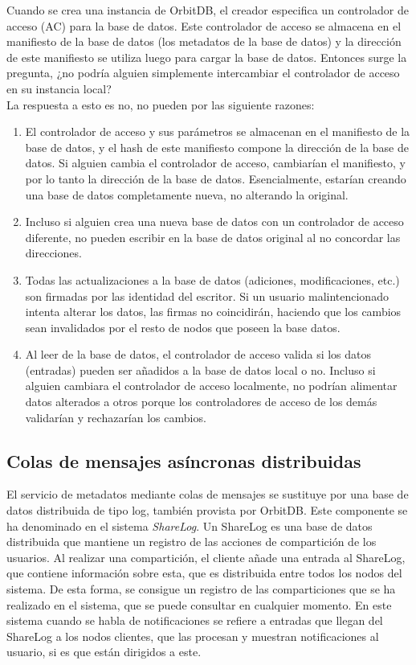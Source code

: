 Cuando se crea una instancia de OrbitDB, el creador especifica un controlador de acceso (AC) para la base de datos.
Este controlador de acceso se almacena en el manifiesto de la base de datos (los metadatos de la base de datos)
y la dirección de este manifiesto se utiliza luego para cargar la base de datos. Entonces surge la pregunta, ¿no podría alguien simplemente intercambiar el controlador de acceso en su instancia local?
\\
La respuesta a esto es no, no pueden por las siguiente razones:
\begin{enumerate}[noitemsep,after=\vspace{-0.4\baselineskip}]
  \item El controlador de acceso y sus parámetros se almacenan en el manifiesto de la base de datos, y el hash de este manifiesto compone la dirección de la base de datos. Si alguien cambia el controlador de acceso, cambiarían el manifiesto, y por lo tanto la dirección de la base de datos. Esencialmente, estarían creando una base de datos completamente nueva, no alterando la original.
  \item Incluso si alguien crea una nueva base de datos con un controlador de acceso diferente, no pueden escribir en la base de datos original al no concordar las direcciones.
  \item Todas las actualizaciones a la base de datos (adiciones, modificaciones, etc.) son firmadas por las identidad del escritor. Si un usuario malintencionado intenta alterar los datos, las firmas no coincidirán, haciendo que los cambios sean invalidados por el resto de nodos que poseen la base datos.
  \item Al leer de la base de datos, el controlador de acceso valida si los datos (entradas) pueden ser añadidos a la base de datos local o no. Incluso si alguien cambiara el controlador de acceso localmente, no podrían alimentar datos alterados a otros porque los controladores de acceso de los demás validarían y rechazarían los cambios.
\end{enumerate}

\subsection{Colas de mensajes asíncronas distribuidas}
El servicio de metadatos mediante colas de mensajes se sustituye por una base de datos distribuida de tipo
log, también provista por OrbitDB. Este componente se ha denominado en el sistema \textit{ShareLog}.
Un ShareLog es una base de datos distribuida que mantiene un registro de las acciones de compartición de los usuarios. Al realizar una compartición, el cliente añade una entrada al ShareLog, que contiene información sobre esta, que es distribuida entre todos los nodos del sistema. De esta forma, se consigue un registro de las comparticiones que se ha realizado en el sistema, que se puede consultar en cualquier momento. En este sistema cuando se habla
de notificaciones se refiere a entradas que llegan del ShareLog a los nodos clientes, que las procesan y muestran notificaciones al usuario, si es que están dirigidos a este.

